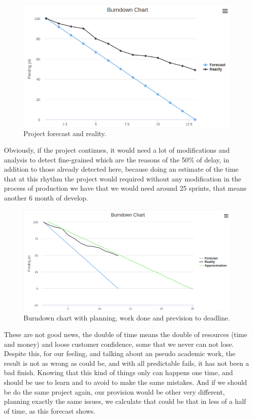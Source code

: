 \begin{figure}[H]
  \includegraphics[scale=0.45]{img/graphics/burndown2.png}
  \centering
  \caption{Project forecast and reality.}
\end{figure}

\noindent Obviously, if the project continues, it would need a lot of
modifications and analysis to detect fine-grained which are the reasons
of the 50\% of delay, in addition to those already detected here,
because doing an estimate of the time that at this rhythm the project would required
without any modification in the process of production we have that we would need
around 25 sprints, that means another 6 month of develop.

\begin{figure}[H]
  \includegraphics[scale=0.45]{img/graphics/burndown3.png}
  \centering
  \caption{Burndown chart with planning, work done and prevision to deadline.}
\end{figure}

\noindent These are not good news, the double of time means the double of resources (time and
money) and loose customer confidence, some that we never can not lose.
Despite this, for our feeling, and talking about an pseudo academic work,
the result is not as wrong as could be, and with all predictable fails,
it has not been a bad finish. Knowing that this kind of things only can happens
one time, and should be use to learn and to avoid to make the same mistakes.
\intro
And if we should be do the same project again, our provision would be other
very different, planning exactly the same issues, we calculate that could be
that in less of a half of time, as this forecast shows.

